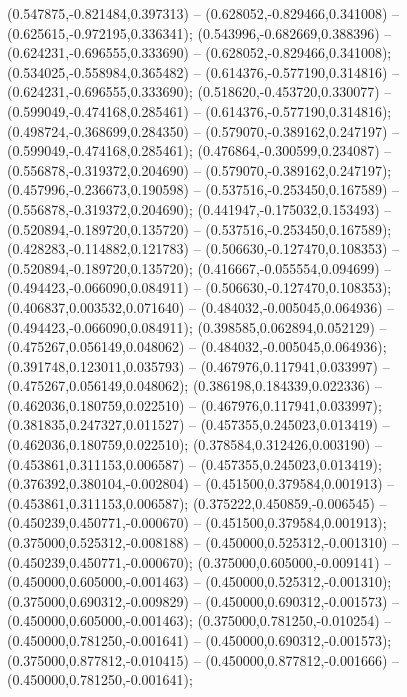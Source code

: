  (0.547875,-0.821484,0.397313) -- (0.628052,-0.829466,0.341008) -- (0.625615,-0.972195,0.336341);
 (0.543996,-0.682669,0.388396) -- (0.624231,-0.696555,0.333690) -- (0.628052,-0.829466,0.341008);
 (0.534025,-0.558984,0.365482) -- (0.614376,-0.577190,0.314816) -- (0.624231,-0.696555,0.333690);
 (0.518620,-0.453720,0.330077) -- (0.599049,-0.474168,0.285461) -- (0.614376,-0.577190,0.314816);
 (0.498724,-0.368699,0.284350) -- (0.579070,-0.389162,0.247197) -- (0.599049,-0.474168,0.285461);
 (0.476864,-0.300599,0.234087) -- (0.556878,-0.319372,0.204690) -- (0.579070,-0.389162,0.247197);
 (0.457996,-0.236673,0.190598) -- (0.537516,-0.253450,0.167589) -- (0.556878,-0.319372,0.204690);
 (0.441947,-0.175032,0.153493) -- (0.520894,-0.189720,0.135720) -- (0.537516,-0.253450,0.167589);
 (0.428283,-0.114882,0.121783) -- (0.506630,-0.127470,0.108353) -- (0.520894,-0.189720,0.135720);
 (0.416667,-0.055554,0.094699) -- (0.494423,-0.066090,0.084911) -- (0.506630,-0.127470,0.108353);
 (0.406837,0.003532,0.071640) -- (0.484032,-0.005045,0.064936) -- (0.494423,-0.066090,0.084911);
 (0.398585,0.062894,0.052129) -- (0.475267,0.056149,0.048062) -- (0.484032,-0.005045,0.064936);
 (0.391748,0.123011,0.035793) -- (0.467976,0.117941,0.033997) -- (0.475267,0.056149,0.048062);
 (0.386198,0.184339,0.022336) -- (0.462036,0.180759,0.022510) -- (0.467976,0.117941,0.033997);
 (0.381835,0.247327,0.011527) -- (0.457355,0.245023,0.013419) -- (0.462036,0.180759,0.022510);
 (0.378584,0.312426,0.003190) -- (0.453861,0.311153,0.006587) -- (0.457355,0.245023,0.013419);
 (0.376392,0.380104,-0.002804) -- (0.451500,0.379584,0.001913) -- (0.453861,0.311153,0.006587);
 (0.375222,0.450859,-0.006545) -- (0.450239,0.450771,-0.000670) -- (0.451500,0.379584,0.001913);
 (0.375000,0.525312,-0.008188) -- (0.450000,0.525312,-0.001310) -- (0.450239,0.450771,-0.000670);
 (0.375000,0.605000,-0.009141) -- (0.450000,0.605000,-0.001463) -- (0.450000,0.525312,-0.001310);
 (0.375000,0.690312,-0.009829) -- (0.450000,0.690312,-0.001573) -- (0.450000,0.605000,-0.001463);
 (0.375000,0.781250,-0.010254) -- (0.450000,0.781250,-0.001641) -- (0.450000,0.690312,-0.001573);
 (0.375000,0.877812,-0.010415) -- (0.450000,0.877812,-0.001666) -- (0.450000,0.781250,-0.001641);
